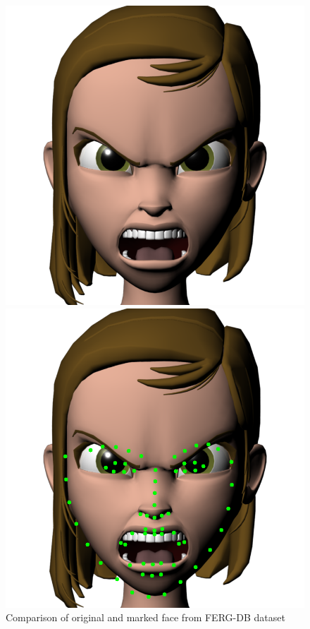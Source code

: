 \documentclass{Project}
\begin{document}
\begin{figure}[h!]
  \centering
  \begin{minipage}[b]{0.4\linewidth}
    \includegraphics[width=\linewidth]{aia_anger_127.png}
  \end{minipage}
  \begin{minipage}[b]{0.4\linewidth}
    \includegraphics[width=\linewidth]{aia_anger_127_annotated.png}
  \end{minipage}
  \caption{Comparison of original and marked face from FERG-DB dataset}
  \label{fig:happyReal1}
\end{figure}
\end{document}

